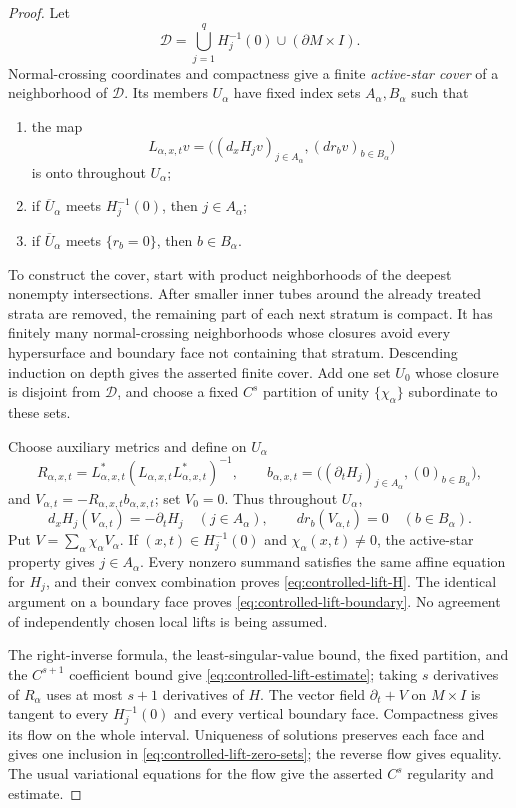 \documentclass[11pt]{amsart}
\numberwithin{equation}{section}
\theoremstyle{definition}
\theoremstyle{remark}
\begin{document}
\begin{proof}
Let
\[
 \mathcal D=\bigcup_{j=1}^qH_j^{-1}(0)
       \cup(\partial M\times I).
\]
Normal-crossing coordinates and compactness give a finite
\emph{active-star cover} of a neighborhood of $\mathcal D$.  Its members
$U_\alpha$ have fixed index sets $A_\alpha,B_\alpha$ such that
\begin{enumerate}
\item the map
\[
 L_{\alpha,x,t}v
 =\bigl((d_xH_jv)_{j\in A_\alpha},
        (dr_bv)_{b\in B_\alpha}\bigr)
\]
is onto throughout $U_\alpha$;
\item if $\overline U_\alpha$ meets $H_j^{-1}(0)$, then
$j\in A_\alpha$;
\item if $\overline U_\alpha$ meets $\{r_b=0\}$, then
$b\in B_\alpha$.
\end{enumerate}
To construct the cover, start with product neighborhoods of the deepest
nonempty intersections.  After smaller inner tubes around the already
treated strata are removed, the remaining part of each next stratum is
compact.  It has finitely many normal-crossing neighborhoods whose
closures avoid every hypersurface and boundary face not containing that
stratum.  Descending induction on depth gives the asserted finite cover.
Add one set $U_0$ whose closure is disjoint from $\mathcal D$, and choose
a fixed $C^s$ partition of unity $\{\chi_\alpha\}$ subordinate to these
sets.

Choose auxiliary metrics and define on $U_\alpha$
\begin{equation}\label{eq:controlled-lift-right-inverse}
 R_{\alpha,x,t}
 =L_{\alpha,x,t}^*
   (L_{\alpha,x,t}L_{\alpha,x,t}^*)^{-1},\qquad
 b_{\alpha,x,t}
 =\bigl((\partial_tH_j)_{j\in A_\alpha},
        (0)_{b\in B_\alpha}\bigr),
\end{equation}
and $V_{\alpha,t}=-R_{\alpha,x,t}b_{\alpha,x,t}$; set $V_0=0$.  Thus
throughout $U_\alpha$,
\[
 d_xH_j(V_{\alpha,t})=-\partial_tH_j\quad(j\in A_\alpha),
 \qquad dr_b(V_{\alpha,t})=0\quad(b\in B_\alpha).
\]
Put $V=\sum_\alpha\chi_\alpha V_\alpha$.  If
$(x,t)\in H_j^{-1}(0)$ and $\chi_\alpha(x,t)\ne0$, the active-star
property gives $j\in A_\alpha$.  Every nonzero summand satisfies the same
affine equation for $H_j$, and their convex combination proves
\eqref{eq:controlled-lift-H}.  The identical argument on a boundary face
proves \eqref{eq:controlled-lift-boundary}.  No agreement of independently
chosen local lifts is being assumed.

The right-inverse formula, the least-singular-value bound, the fixed
partition, and the $C^{s+1}$ coefficient bound give
\eqref{eq:controlled-lift-estimate}; taking $s$ derivatives of
$R_\alpha$ uses at most $s+1$ derivatives of $H$.  The vector field
$\partial_t+V$ on $M\times I$ is tangent to every $H_j^{-1}(0)$ and every
vertical boundary face.  Compactness gives its flow on the whole interval.
Uniqueness of solutions preserves each face and gives one inclusion in
\eqref{eq:controlled-lift-zero-sets}; the reverse flow gives equality.
The usual variational equations for the flow give the asserted $C^s$
regularity and estimate.
\end{proof}
\end{document}
